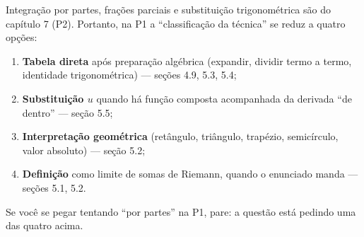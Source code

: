 \begin{dica}
Integração por partes, frações parciais e substituição trigonométrica são do capítulo 7 (P2). Portanto, na P1 a ``classificação da técnica'' se reduz a quatro opções:
\begin{enumerate}[leftmargin=1.6em, itemsep=1pt]
\item \textbf{Tabela direta} após preparação algébrica (expandir, dividir termo a termo, identidade trigonométrica) --- seções 4.9, 5.3, 5.4;
\item \textbf{Substituição $u$} quando há função composta acompanhada da derivada ``de dentro'' --- seção 5.5;
\item \textbf{Interpretação geométrica} (retângulo, triângulo, trapézio, semicírculo, valor absoluto) --- seção 5.2;
\item \textbf{Definição} como limite de somas de Riemann, quando o enunciado manda --- seções 5.1, 5.2.
\end{enumerate}
Se você se pegar tentando ``por partes'' na P1, pare: a questão está pedindo uma das quatro acima.
\end{dica}
